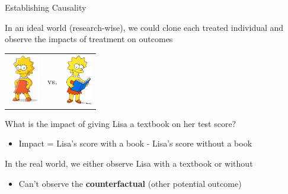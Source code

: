\documentclass[10pt,xcolor=table,ignorenonframetext,handout,aspectratio=169]{beamer}
\newlength{\wideitemsep}
\let\olditem\item
\renewcommand{\item}{\setlength{\itemsep}{\wideitemsep}\olditem}
\begin{document}

\begin{frame}{Establishing Causality}

\medskip
In an ideal world (research-wise), we could clone each treated individual and observe the impacts of treatment on outcomes 

\begin{center}
	\begin{tabular}{ccc}
		\includegraphics[height=2.2cm]{img/lisa1.png} & vs. & \includegraphics[height=2.2cm]{img/lisa-book.jpg}
	\end{tabular}
\end{center}

\medskip
What is the impact of giving Lisa a textbook on her test score?

\medskip
\begin{itemize}
	
	\item
	Impact = Lisa's score with a book - Lisa's score without a book
	
\end{itemize}

\pause
\medskip
In the real world, we either observe Lisa with a textbook or without

\medskip
\begin{itemize}
	
	\item
	Can't observe the \textbf{counterfactual} (other potential outcome)
	
\end{itemize}

\end{frame}


\end{document}
